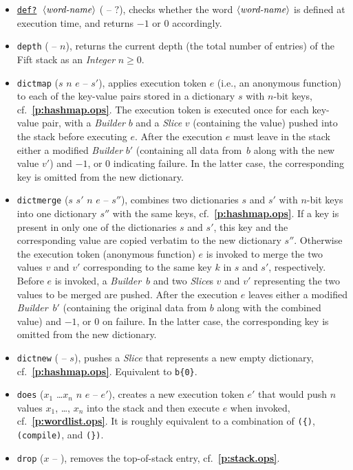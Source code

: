 \documentclass[12pt,oneside]{article}
\def\refpoint#1{{\rm\textbf{\ref{#1}}}}
\let\ptref=\refpoint
\begin{document}
\begin{itemize}
\item {\tt \underline{def?} $\langle\textit{word-name\/}\rangle$} ( -- $?$), checks whether the word $\langle\textit{word-name\/}\rangle$ is defined at execution time, and returns $-1$ or $0$ accordingly.
\item {\tt depth} ( -- $n$), returns the current depth (the total number of entries) of the Fift stack as an {\em Integer\/} $n\geq0$.
\item {\tt dictmap} ($s$ $n$ $e$ -- $s'$), applies execution token $e$ (i.e., an anonymous function) to each of the key-value pairs stored in a dictionary $s$ with $n$-bit keys, cf.~\ptref{p:hashmap.ops}. The execution token is executed once for each key-value pair, with a {\em Builder\/} $b$ and a {\em Slice\/} $v$ (containing the value) pushed into the stack before executing $e$. After the execution $e$ must leave in the stack either a modified {\em Builder\/} $b'$ (containing all data from~$b$ along with the new value $v'$) and $-1$, or $0$ indicating failure. In the latter case, the corresponding key is omitted from the new dictionary.
\item {\tt dictmerge} ($s$ $s'$ $n$ $e$ -- $s''$), combines two dictionaries $s$ and $s'$ with $n$-bit keys into one dictionary $s''$ with the same keys, cf.~\ptref{p:hashmap.ops}. If a key is present in only one of the dictionaries $s$ and $s'$, this key and the corresponding value are copied verbatim to the new dictionary $s''$. Otherwise the execution token (anonymous function) $e$ is invoked to merge the two values $v$ and $v'$ corresponding to the same key $k$ in $s$ and $s'$, respectively. Before $e$ is invoked, a {\em Builder\/}~$b$ and two {\em Slice\/}s $v$ and $v'$ representing the two values to be merged are pushed. After the execution $e$ leaves either a modified {\em Builder\/}~$b'$ (containing the original data from $b$ along with the combined value) and $-1$, or $0$ on failure. In the latter case, the corresponding key is omitted from the new dictionary.
\item {\tt dictnew} ( -- $s$), pushes a {\em Slice\/} that represents a new empty dictionary, cf.~\ptref{p:hashmap.ops}. Equivalent to {\tt b\{0\}}.
\item {\tt does} ($x_1$ \dots $x_n$ $n$ $e$ -- $e'$), creates a new execution token $e'$ that would push $n$ values $x_1$, \dots, $x_n$ into the stack and then execute $e$ when invoked, cf.~\ptref{p:wordlist.ops}. It is roughly equivalent to a combination of {\tt (\{)}, {\tt (compile)}, and {\tt (\})}.
\item {\tt drop} ($x$ -- ), removes the top-of-stack entry, cf.~\ptref{p:stack.ops}.

\end{itemize}
\end{document}
